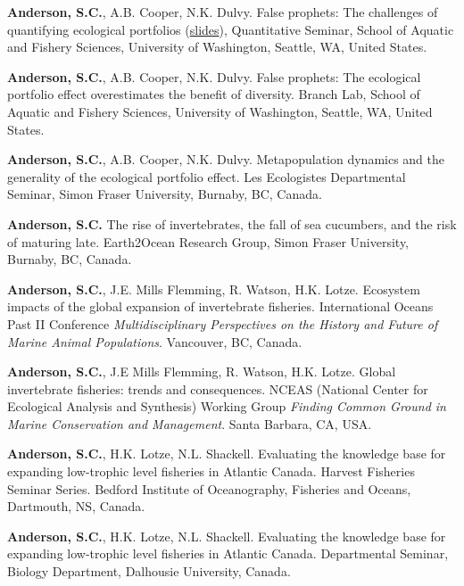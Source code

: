 \begin{description}
\itemsep3pt\parskip0pt
\item[2013]
\textbf{Anderson, S.C.}, A.B. Cooper, N.K. Dulvy. False prophets: The
challenges of quantifying ecological portfolios
(\href{http://seananderson.ca/talks/2013/PE_SAFS_quantsem.pdf}{slides}),
Quantitative Seminar, School of Aquatic and Fishery Sciences, University
of Washington, Seattle, WA, United States.
\item[2012]
\textbf{Anderson, S.C.}, A.B. Cooper, N.K. Dulvy. False prophets: The
ecological portfolio effect overestimates the benefit of diversity.
Branch Lab, School of Aquatic and Fishery Sciences, University of
Washington, Seattle, WA, United States.
\item[2012]
\textbf{Anderson, S.C.}, A.B. Cooper, N.K. Dulvy. Metapopulation
dynamics and the generality of the ecological portfolio effect. Les
Ecologistes Departmental Seminar, Simon Fraser University, Burnaby, BC,
Canada.
\item[2010]
\textbf{Anderson, S.C.} The rise of invertebrates, the fall of sea
cucumbers, and the risk of maturing late. Earth2Ocean Research Group,
Simon Fraser University, Burnaby, BC, Canada.
\item[2009]
\textbf{Anderson, S.C.}, J.E. Mills Flemming, R. Watson, H.K. Lotze.
Ecosystem impacts of the global expansion of invertebrate fisheries.
International Oceans Past II Conference \emph{Multidisciplinary
Perspectives on the History and Future of Marine Animal Populations}.
Vancouver, BC, Canada.
\item[2009]
\textbf{Anderson, S.C.}, J.E Mills Flemming, R. Watson, H.K. Lotze.
Global invertebrate fisheries: trends and consequences. NCEAS (National
Center for Ecological Analysis and Synthesis) Working Group
\emph{Finding Common Ground in Marine Conservation and Management}.
Santa Barbara, CA, USA.
\item[2009]
\textbf{Anderson, S.C.}, H.K. Lotze, N.L. Shackell. Evaluating the
knowledge base for expanding low-trophic level fisheries in Atlantic
Canada. Harvest Fisheries Seminar Series. Bedford Institute of
Oceanography, Fisheries and Oceans, Dartmouth, NS, Canada.
\item[2008]
\textbf{Anderson, S.C.}, H.K. Lotze, N.L. Shackell. Evaluating the
knowledge base for expanding low-trophic level fisheries in Atlantic
Canada. Departmental Seminar, Biology Department, Dalhousie University,
Canada.
\end{description}

